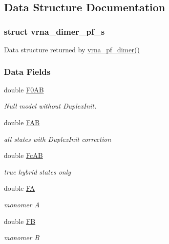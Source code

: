 \subsection{Data Structure Documentation}
\label{structvrna__dimer__pf__s}
\subsubsection{struct vrna\+\_\+dimer\+\_\+pf\+\_\+s}
Data structure returned by \mbox{\hyperlink{group__pf__cofold_ga4e5c7d06c302a7c59fc0d64dc142ca63}{vrna\+\_\+pf\+\_\+dimer()}} \subsubsection*{Data Fields}
\begin{DoxyCompactItemize}
\item 
double \mbox{\hyperlink{group__pf__cofold_a82e31d1fb6e95923fab6036f52c370af}{F0\+AB}}
\begin{DoxyCompactList}\small\item\em Null model without Duplex\+Init. \end{DoxyCompactList}\item 
double \mbox{\hyperlink{group__pf__cofold_a01a87f59db2b7fbf883b056e6f6c673a}{F\+AB}}
\begin{DoxyCompactList}\small\item\em all states with Duplex\+Init correction \end{DoxyCompactList}\item 
double \mbox{\hyperlink{group__pf__cofold_a7b01cea5721f61badebc29cf0a9c4266}{Fc\+AB}}
\begin{DoxyCompactList}\small\item\em true hybrid states only \end{DoxyCompactList}\item 
double \mbox{\hyperlink{group__pf__cofold_a1aca57247f2c023d08028b1919005b0a}{FA}}
\begin{DoxyCompactList}\small\item\em monomer A \end{DoxyCompactList}\item 
double \mbox{\hyperlink{group__pf__cofold_ab4d307be5400604d3c1d84d58a9981df}{FB}}
\begin{DoxyCompactList}\small\item\em monomer B \end{DoxyCompactList}\end{DoxyCompactItemize}


